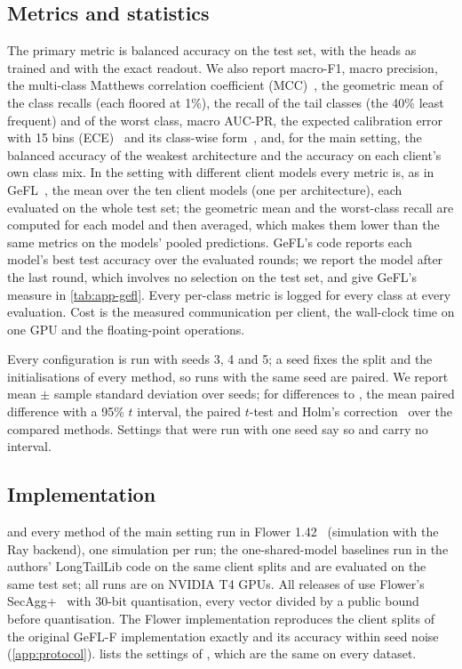 \subsection{Metrics and statistics}\label{sec:setup-metrics}

The primary metric is balanced accuracy on the test set, with the heads as trained and with the exact readout. We
also report macro-F1, macro precision, the multi-class Matthews correlation coefficient (MCC)~\cite{gorodkin2004mcc},
the geometric mean of the class recalls (each floored at 1\%), the recall of the tail classes (the 40\% least
frequent) and of the worst class, macro AUC-PR, the expected calibration error with 15 bins
(ECE)~\cite{guo2017calibration} and its class-wise form~\cite{kull2019classwise}, and, for the main setting, the balanced
accuracy of the weakest architecture and the accuracy on each client's own class mix. In the setting with different
client models every metric is, as in GeFL~\cite{kang2025gefl}, the mean over the ten client models (one per
architecture), each evaluated on the whole test set; the geometric mean and the worst-class recall are computed for
each model and then averaged, which makes them lower than the same metrics on the models' pooled predictions. GeFL's
code reports each model's best test accuracy over the evaluated rounds; we report the model after the last round,
which involves no selection on the test set, and give GeFL's measure in \cref{tab:app-gefl}. Every per-class metric is
logged for every class at every evaluation. Cost is the measured communication per client, the wall-clock time on one
GPU and the floating-point operations.

Every configuration is run with seeds 3, 4 and 5; a seed fixes the split and the initialisations of every method, so
runs with the same seed are paired. We report mean $\pm$ sample standard deviation over seeds; for differences to
\ours, the mean paired difference with a 95\% $t$ interval, the paired $t$-test and Holm's correction~\cite{holm1979}
over the compared methods. Settings that were run with one seed say so and carry no interval.

\subsection{Implementation}\label{sec:setup-impl}

\ours and every method of the main setting run in Flower 1.42~\cite{beutel2020flower} (simulation with the Ray
backend), one simulation per run; the one-shared-model baselines run in the authors' LongTailLib code on the same
client splits and are evaluated on the same test set; all runs are on
NVIDIA T4 GPUs. All releases of \ours use Flower's SecAgg+~\cite{bell2020secaggplus} with 30-bit quantisation, every
vector divided by a public bound before quantisation. The Flower implementation reproduces the client splits of the
original GeFL-F implementation exactly and its accuracy within seed noise (\cref{app:protocol}). 
lists the settings of \ours, which are the same on every dataset.

